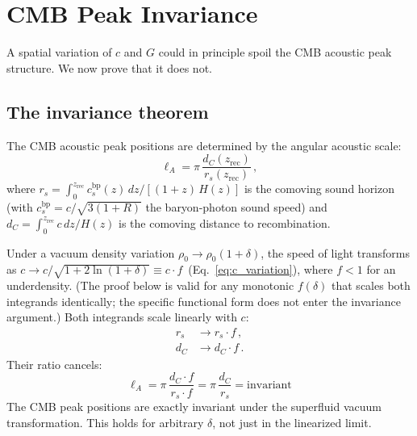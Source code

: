 \documentclass[12pt, a4paper]{article}
\begin{document}
\section{CMB Peak Invariance}
\label{sec:cmb}

A spatial variation of $c$ and $G$ could in principle spoil the CMB acoustic peak structure. We now prove that it does not.

\subsection{The invariance theorem}

The CMB acoustic peak positions are determined by the angular acoustic scale:
\begin{equation}
    \ell_A = \pi\,\frac{d_C(z_{\mathrm{rec}})}{r_s(z_{\mathrm{rec}})}\,,
\label{eq:ell_A}
\end{equation}
where $r_s = \int_0^{z_{\mathrm{rec}}} c_s^{\mathrm{bp}}(z)\,dz/[(1+z)\,H(z)]$ is the comoving sound horizon (with $c_s^{\mathrm{bp}} = c/\sqrt{3(1+R)}$ the baryon-photon sound speed) and $d_C = \int_0^{z_{\mathrm{rec}}} c\,dz/H(z)$ is the comoving distance to recombination.

Under a vacuum density variation $\rho_0 \to \rho_0(1+\delta)$, the speed of light transforms as $c \to c/\sqrt{1 + 2\ln(1+\delta)} \equiv c \cdot f$~(Eq.~\ref{eq:c_variation}), where $f < 1$ for an underdensity. (The proof below is valid for any monotonic $f(\delta)$ that scales both integrands identically; the specific functional form does not enter the invariance argument.) Both integrands scale linearly with $c$:
\begin{align}
    r_s &\to r_s \cdot f\,,\\
    d_C &\to d_C \cdot f\,.
\end{align}
Their ratio cancels:
\begin{equation}
    \boxed{\;\ell_A = \pi\,\frac{d_C \cdot f}{r_s \cdot f} = \pi\,\frac{d_C}{r_s} = \text{invariant}\;}
\label{eq:invariance}
\end{equation}
The CMB peak positions are exactly invariant under the superfluid vacuum transformation. This holds for arbitrary $\delta$, not just in the linearized limit.
\end{document}

